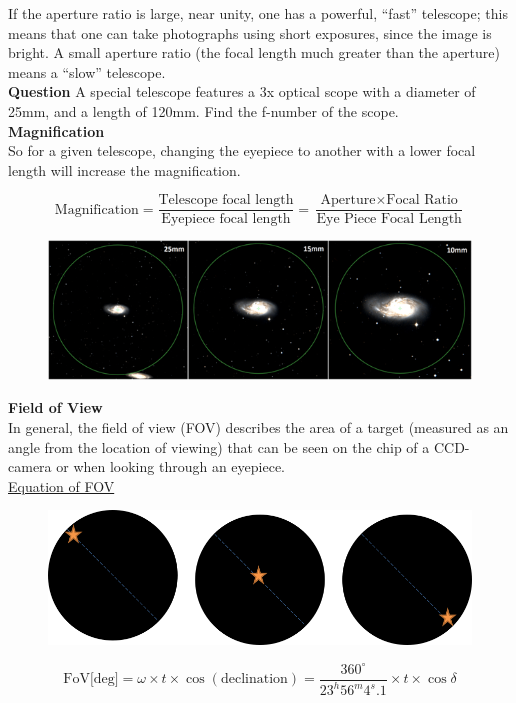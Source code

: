 \documentclass[a4paper,12pt]{extarticle}
\begin{document}
If the aperture ratio is large, near unity, one has a powerful, ``fast'' telescope; this means that one can take photographs using short exposures, since the image is bright. A small aperture ratio (the focal length much greater than the aperture) means a ``slow'' telescope.\\

\textsf{\textbf{Question}} A special telescope features a 3x optical scope  with a diameter of 25mm, and a length of 120mm. Find the f-number of the scope.\\

\textbf{Magnification}\\

So for a given telescope, changing the eyepiece to another with a lower focal length will increase the magnification. 

$$\text{Magnification}=\frac{\text{Telescope focal length}}{\text{Eyepiece focal length}}=\frac{\text{Aperture}\times \text{Focal Ratio}}{\text{Eye Piece Focal Length}}$$ 

\begin{figure}[H]
	\centering
	\includegraphics[width=0.9\linewidth]{tel_magnify.png}
\end{figure}

\clearpage 
\textbf{Field of View}\\

In general, the field of view (FOV) describes the area of a target (measured as an angle from the location of viewing) that can be seen on the chip of a CCD-camera or when looking through an eyepiece.\\

\underline{\textsf{Equation of FOV}}\\

\begin{figure}[H]
	\centering
	\includegraphics[width=0.9\linewidth]{FOV1.png}
\end{figure}
{\color{red}
	$$\text{FoV[deg]}= \omega \times t \times \cos(\text{declination})=\frac{360^\circ}{23^h56^m4^s.1}\times t\times \cos\delta$$}
\end{document}
